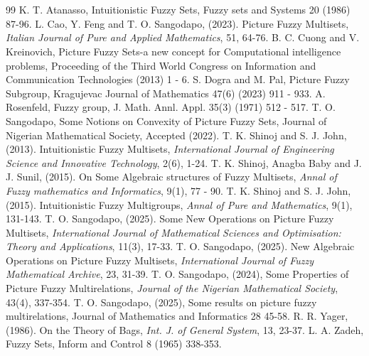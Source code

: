 \documentclass[12pt,letterpaper]{amsart}
\theoremstyle{plain}
\theoremstyle{definition}
\numberwithin{equation}{section}
\begin{document}
\ \\ \ \\

\begin{thebibliography}{99}
 K. T. Atanasso, Intuitionistic Fuzzy Sets, Fuzzy sets and Systems 20 (1986) 87-96.
 L. Cao, Y. Feng and T. O. Sangodapo, (2023). Picture Fuzzy Multisets, \emph{Italian Journal of Pure and Applied Mathematics}, 51, 64-76.
 B. C. Cuong and V. Kreinovich, Picture Fuzzy Sets-a new concept for Computational intelligence problems, Proceeding of the Third World Congress on Information and Communication Technologies (2013) 1 - 6.
 S. Dogra and M. Pal, Picture Fuzzy Subgroup, Kragujevac Journal of Mathematics 47(6) (2023) 911 - 933.
 A. Rosenfeld, Fuzzy group, J. Math. Annl. Appl. 35(3) (1971) 512 - 517.
 T. O. Sangodapo, Some Notions on Convexity of Picture Fuzzy Sets, Journal of Nigerian Mathematical Society, Accepted (2022).
 T. K. Shinoj and S. J. John, (2013). Intuitionistic Fuzzy Multisets, \emph{ International Journal of Engineering Science and Innovative Technology}, 2(6), 1-24.
 T. K. Shinoj, Anagba Baby and J. J. Sunil, (2015). On Some Algebraic structures of Fuzzy Multisets, \emph{Annal of Fuzzy mathematics and Informatics}, 9(1), 77 - 90.
 T. K. Shinoj and S. J. John, (2015). Intuitionistic Fuzzy Multigroups, \emph{Annal of Pure and Mathematics}, 9(1), 131-143.
 T. O. Sangodapo, (2025). Some New Operations on Picture Fuzzy Multisets, \emph{International Journal of Mathematical Sciences and Optimisation: Theory and Applications}, 11(3), 17-33.
 T. O. Sangodapo, (2025). New Algebraic Operations on Picture Fuzzy Multisets, \emph{International Journal of Fuzzy Mathematical Archive}, 23, 31-39.
 T. O. Sangodapo, (2024), Some Properties of Picture Fuzzy Multirelations, \emph{Journal of the Nigerian Mathematical Society}, 43(4), 337-354.
 T. O. Sangodapo, (2025), Some results on picture fuzzy multirelations, Journal of Mathematics and Informatics 28 45-58.
 R. R. Yager,(1986). On the Theory of Bags, \emph{Int. J. of General System}, 13, 23-37.
 L. A. Zadeh, Fuzzy Sets, Inform and Control 8 (1965) 338-353.
\end{thebibliography}
\end{document}
